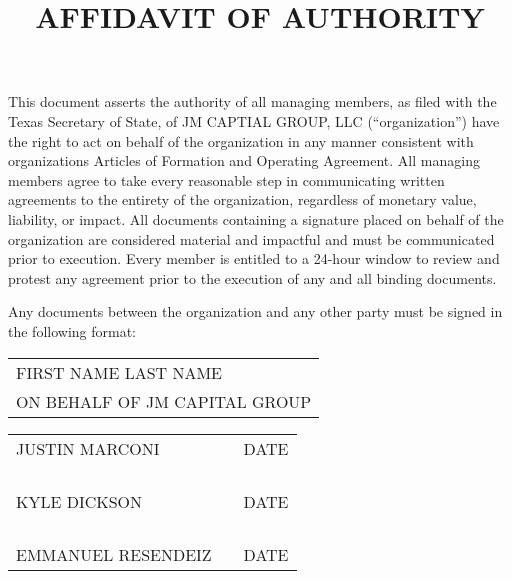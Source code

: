 \documentclass[11pt]{article}
\title{AFFIDAVIT OF AUTHORITY}
\begin{document}
\maketitle

This document asserts the authority of all managing members, as filed with the Texas Secretary of State, of JM CAPTIAL GROUP, LLC (“organization”) have the right to act on behalf of the organization in any manner consistent with organizations Articles of Formation and Operating Agreement. All managing members agree to take every reasonable step in communicating written agreements to the entirety of the organization, regardless of monetary value, liability, or impact. All documents containing a signature placed on behalf of the organization are considered material and impactful and must be communicated prior to execution. Every member is entitled to a 24-hour window to review and protest any agreement prior to the execution of any and all binding documents.

Any documents between the organization and any other party must be signed in the following format:

\vspace{0.25in}
\begin{tabular}{l}
    FIRST NAME LAST NAME \\
    ON BEHALF OF JM CAPITAL GROUP \\
\end{tabular}

\vfill
\centering
\begin{tabular}{lll}
\cline{1-1} \cline{3-3}
\multicolumn{1}{p{2.5in}}{JUSTIN MARCONI} & \multicolumn{1}{p{1in}}{} & \multicolumn{1}{p{2.5in}}{DATE} \\
& & \\
& & \\
& & \\
& & \\
\cline{1-1} \cline{3-3}
\multicolumn{1}{p{2.5in}}{KYLE DICKSON} & \multicolumn{1}{p{1in}}{} & \multicolumn{1}{p{2.5in}}{DATE} \\
& & \\
& & \\
& & \\
& & \\
\cline{1-1} \cline{3-3}
\multicolumn{1}{p{2.5in}}{EMMANUEL RESENDEIZ} & \multicolumn{1}{p{1in}}{} & \multicolumn{1}{p{2.5in}}{DATE} \\
\end{tabular}
\end{document}
